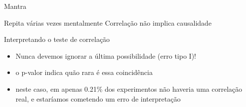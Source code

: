 \documentclass{beamer}
\begin{document}
\begin{frame}[label=mantra]{{\small Mantra}}
  \begin{block}{Repita várias vezes mentalmente}
    \LARGE
    \centering
    Correlação não implica causalidade
  \end{block}
\end{frame}

\begin{frame}{Interpretando o teste de correlação}
  \begin{itemize}
    \small
  \item Nunca devemos ignorar a última possibilidade (erro tipo I)!
  \item o p-valor indica quão rara é essa coincidência
  \item neste caso, em apenas 0.21\% dos experimentos não haveria uma
    correlação real, e estaríamos cometendo um erro de interpretação
  \end{itemize}
\end{frame}


\end{document}
